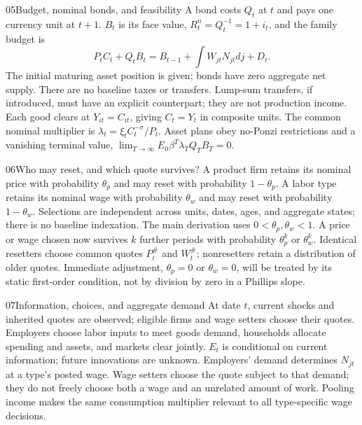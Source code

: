 \begin{modelsetup}[1]
\begin{modelcondition}{05}{Budget, nominal bonds, and feasibility}
A bond costs $Q_t$ at $t$ and pays one currency unit at $t+1$. $B_t$ is its
face value, $R_t^n=Q_t^{-1}=1+i_t$, and the family budget is
\[
 P_tC_t+Q_tB_t=B_{t-1}+\int W_{jt}N_{jt}dj+D_t.
\]
The initial maturing asset position is given; bonds have zero aggregate net
supply. There are no baseline taxes or transfers. Lump-sum transfers, if
introduced, must have an explicit counterpart; they are not production income.
Each good clears at $Y_{it}=C_{it}$, giving $C_t=Y_t$ in composite units.
The common nominal multiplier is $\lambda_t=\xi_tC_t^{-\sigma}/P_t$.
Asset plans obey no-Ponzi restrictions and a vanishing terminal value,
$\lim_{T\to\infty}E_0\beta^T\lambda_TQ_TB_T=0$.
\end{modelcondition}
\end{modelsetup}

\begin{modelsetup}[1]
\begin{modelcondition}{06}{Who may reset, and which quote survives?}
A product firm retains its nominal price with probability $\theta_p$ and may
reset with probability $1-\theta_p$. A labor type retains its nominal wage
with probability $\theta_w$ and may reset with probability $1-\theta_w$.
Selections are independent across units, dates, ages, and aggregate states;
there is no baseline indexation. The main derivation uses
$0<\theta_p,\theta_w<1$. A price or wage chosen now survives $k$ further
periods with probability $\theta_p^k$ or $\theta_w^k$. Identical resetters choose
common quotes $P_t^{\#}$ and $W_t^{\#}$; nonresetters retain a distribution of
older quotes. Immediate adjustment, $\theta_p=0$ or $\theta_w=0$, will be treated
by its static first-order condition, not by division by zero in a Phillips slope.
\end{modelcondition}
\end{modelsetup}

\begin{modelsetup}[1]
\begin{modelcondition}{07}{Information, choices, and aggregate demand}
At date $t$, current shocks and inherited quotes are observed; eligible firms
and wage setters choose their quotes. Employers choose labor inputs to meet
goods demand, households allocate spending and assets, and markets clear
jointly. $E_t$ is conditional on current information; future innovations are
unknown. Employers' demand determines $N_{jt}$ at a type's posted wage.
Wage setters choose the quote subject to that demand; they do not freely choose
both a wage and an unrelated amount of work. Pooling income makes the same
consumption multiplier relevant to all type-specific wage decisions.
\end{modelcondition}
\end{modelsetup}

